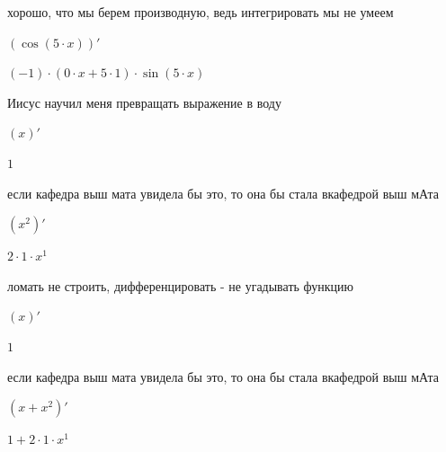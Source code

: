 \documentclass[a4paper,12pt]{article}
\begin{document}
хорошо, что мы берем производную, ведь интегрировать мы не умеем 

\begin{center}$( \cos (5 \cdot x))'$

\end{center}



\begin{center}$(-1) \cdot (0 \cdot x+5 \cdot 1) \cdot  \sin (5 \cdot x)$

\end{center}

Иисус научил меня превращать выражение в воду 

\begin{center}$(x)'$

\end{center}



\begin{center}$1$

\end{center}

если кафедра выш мата увидела бы это, то она бы стала вкафедрой выш мАта 

\begin{center}$(x^{2})'$

\end{center}



\begin{center}$2 \cdot 1 \cdot x^{1}$

\end{center}

ломать не строить, дифференцировать - не угадывать функцию 

\begin{center}$(x)'$

\end{center}



\begin{center}$1$

\end{center}

если кафедра выш мата увидела бы это, то она бы стала вкафедрой выш мАта 

\begin{center}$(x+x^{2})'$

\end{center}



\begin{center}$1+2 \cdot 1 \cdot x^{1}$

\end{center}
\end{document}
